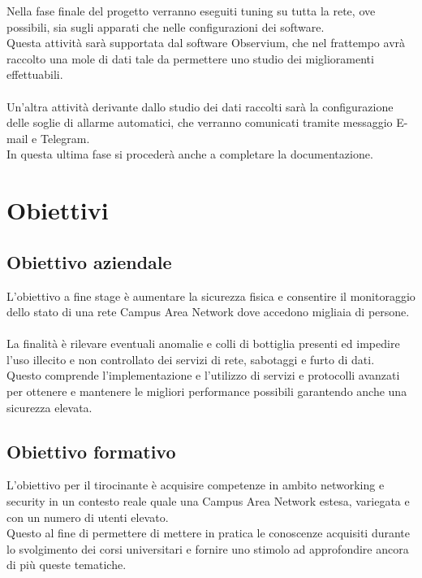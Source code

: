 \documentclass[Tesi.tex]{subfiles}
\begin{document}
Nella fase finale del progetto verranno eseguiti tuning su tutta la rete, ove possibili, sia sugli apparati che nelle configurazioni dei software. \\
Questa attività sarà supportata dal software Observium, che nel frattempo avrà raccolto una mole di dati tale da permettere uno studio dei miglioramenti effettuabili.\\\\
Un'altra attività derivante dallo studio dei dati raccolti sarà la configurazione delle soglie di allarme automatici, che verranno comunicati tramite messaggio E-mail e Telegram. \\
In questa ultima fase si procederà anche a completare la documentazione. 

\section{Obiettivi}
\subsection{Obiettivo aziendale}
L'obiettivo a fine stage è aumentare la sicurezza fisica e consentire il monitoraggio dello stato di una rete Campus Area Network dove accedono migliaia di persone. \\\\
La finalità è rilevare eventuali anomalie e colli di bottiglia presenti ed impedire l'uso illecito e non controllato dei servizi di rete, sabotaggi e furto di dati. \\
Questo comprende l'implementazione e l'utilizzo di servizi e protocolli avanzati per ottenere e mantenere le migliori performance possibili garantendo anche una sicurezza elevata.

\subsection{Obiettivo formativo}
L'obiettivo per il tirocinante è acquisire competenze in ambito networking e security in un contesto reale quale una Campus Area Network estesa, variegata e con un numero di utenti elevato. \\
Questo al fine di permettere di mettere in pratica le conoscenze acquisiti durante lo svolgimento dei corsi universitari e fornire uno stimolo ad approfondire ancora di più queste tematiche.
\end{document}

